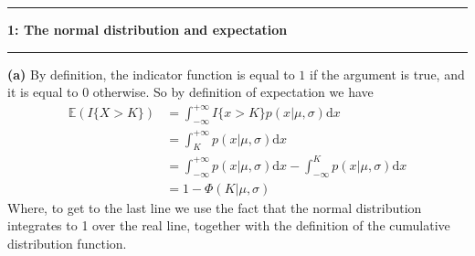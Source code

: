 \documentclass[11pt]{article}
\newcommand\question[2]{\vspace{.25in}\hrule\textbf{#1: #2}\vspace{.5em}\hrule\vspace{.10in}}
\renewcommand\part[1]{\vspace{.10in}\textbf{(#1)}}
\newcommand{\E}{\mathbb{E}}
\begin{document}
\raggedright
\newcommand\NAME{Omar Sosa Rodriguez}  %
\newcommand\HWNUM{Preface}              %


\question{1}{The normal distribution and expectation} 

\part{a} By definition, the indicator function is equal to $1$ if the argument is true, and it is equal to $0$ otherwise.
So by definition of expectation we have
\begin{align}
    \E(I\{X > K\}) &= \int_{-\infty}^{+\infty} I\{x > K\} p(x \vert \mu, \sigma) \mathrm{d}x \nonumber\\
                  &= \int_{K}^{+\infty} p(x\vert \mu, \sigma) \mathrm{d}x\nonumber\\
                  &= \int_{-\infty}^{+\infty}p(x\vert \mu, \sigma)\mathrm{d}x - \int_{-\infty}^{K}p(x\vert \mu, \sigma)\mathrm{d}x\nonumber \\
                  &= 1 - \Phi(K\vert\mu,\sigma)
\end{align}
Where, to get to the last line we use the fact that the normal distribution integrates to 1 over the real line, together with the definition of the cumulative distribution function.
\end{document}
